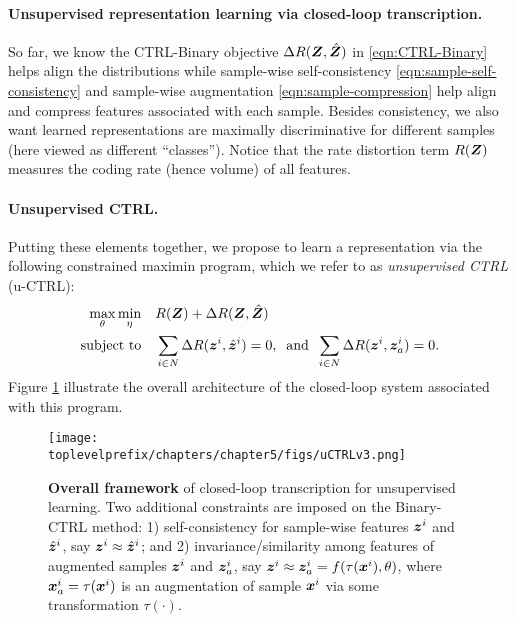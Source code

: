 \documentclass[../../book-main.tex]{subfiles}
\begin{document}
\paragraph{Unsupervised representation learning via closed-loop transcription.} 
So far, we know the CTRL-Binary objective $\Delta R(\bm{Z}, \hat{\bm{Z}})$ in \eqref{eqn:CTRL-Binary} helps align the distributions while sample-wise self-consistency \eqref{eqn:sample-self-consistency} and sample-wise augmentation \eqref{eqn:sample-compression} help align and compress features associated with each sample. Besides consistency, we also want learned representations are maximally discriminative for different samples (here viewed as different ``classes''). Notice that the rate distortion term $R(\bm{Z})$ measures the coding rate (hence volume) of all features. %

\paragraph{Unsupervised CTRL.} Putting these elements together, we propose to learn a representation via the following constrained maximin program, which we refer to as {\em unsupervised CTRL} (u-CTRL):
\begin{align}
      \max_\theta \min_\eta  \quad & R(\bm{Z}) + \Delta R(\bm{Z}, \hat{\bm{Z}}) \label{eqn:constrained_maxmin}\\
 \mbox{subject to} \quad & \sum_{i\in N} \Delta R(\bm{z}^i, \hat{\bm{z}}^i) = 0, \;\; \mbox{and} \;\; \sum_{i\in N} \Delta R(\bm{z}^i, \bm{z}_{a}^i) = 0. \nonumber
\end{align}
Figure \ref{fig:framework-uCTRL} illustrate the overall architecture of the closed-loop system associated with this program.
\begin{figure}[t]
\centering
\texttt{[image: \\toplevelprefix/chapters/chapter5/figs/uCTRLv3.png]}
\caption{\textbf{Overall framework} of closed-loop transcription for unsupervised learning. Two additional constraints are imposed on the Binary-CTRL method: 1) self-consistency for sample-wise features $\bm{z}^i$ and $\hat{\bm{z}}^i$, say $\bm{z}^i \approx \hat{\bm{z}}^i$; and 2) invariance/similarity among features of augmented samples $\bm{z}^i$ and $\bm{z}_{a}^i$, say $\bm{z}^i \approx \bm{z}_{a}^i=f(\tau(\bm{x}^i), \theta)$, where $\bm{x}^i_a=\tau(\bm{x}^i)$ is an augmentation of sample $\bm{x}^i$ via some transformation $\tau(\cdot)$.}
\label{fig:framework-uCTRL}
\end{figure}
\end{document}
